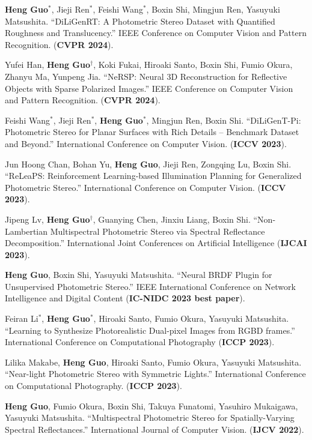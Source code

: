 \documentclass[UTF8]{ctexart}
\begin{document}
\begin{enumerate}[label={[\arabic*]}]
	\item \textbf{Heng Guo}$^*$, Jieji Ren$^*$, Feishi Wang$^*$, Boxin Shi, Mingjun Ren, Yasuyuki Matsushita. ``DiLiGenRT: A Photometric Stereo Dataset with Quantified Roughness and Translucency.'' IEEE Conference on Computer Vision and Pattern Recognition. (\textbf{CVPR 2024}).
	\item Yufei Han, \textbf{Heng Guo$^\dagger$}, Koki Fukai, Hiroaki Santo, Boxin Shi, Fumio Okura, Zhanyu Ma, Yunpeng Jia. ``NeRSP: Neural 3D Reconstruction for Reflective Objects with Sparse Polarized Images.'' IEEE Conference on Computer Vision and Pattern Recognition. (\textbf{CVPR 2024}).
	\item Feishi Wang$^*$, Jieji Ren$^*$, \textbf{Heng Guo}$^*$, Mingjun Ren, Boxin Shi. ``DiLiGenT-Pi: Photometric Stereo for Planar Surfaces with Rich Details – Benchmark Dataset and Beyond.'' International Conference on Computer Vision. (\textbf{ICCV 2023}).
	\item Jun Hoong Chan, Bohan Yu, \textbf{Heng Guo}, Jieji Ren, Zongqing Lu, Boxin Shi. ``ReLeaPS: Reinforcement Learning-based Illumination Planning for Generalized Photometric Stereo.'' International Conference on Computer Vision. (\textbf{ICCV 2023}).
	\item Jipeng Lv, \textbf{Heng Guo$^{\dagger}$}, Guanying Chen, Jinxiu Liang, Boxin Shi. ``Non-Lambertian Multispectral Photometric Stereo via Spectral Reflectance Decomposition.'' International Joint Conferences on Artificial Intelligence (\textbf{IJCAI 2023}).
	\item \textbf{Heng Guo}, Boxin Shi, Yasuyuki Matsushita. ``Neural BRDF Plugin for Unsupervised Photometric Stereo.'' IEEE International Conference on Network Intelligence and Digital Content (\textbf{IC-NIDC 2023 best paper}).
	\item Feiran Li$^*$, \textbf{Heng Guo}$^*$, Hiroaki Santo, Fumio Okura, Yasuyuki Matsushita. ``Learning to Synthesize Photorealistic Dual-pixel Images from RGBD frames.'' International Conference on Computational Photography (\textbf{ICCP 2023}).
	\item Lilika Makabe, \textbf{Heng Guo}, Hiroaki Santo, Fumio Okura, Yasuyuki Matsushita. ``Near-light Photometric Stereo with Symmetric Lights.'' International Conference on Computational Photography. (\textbf{ICCP 2023}).
	\item \textbf{Heng Guo}, Fumio Okura, Boxin Shi, Takuya Funatomi, Yasuhiro Mukaigawa, Yasuyuki Matsushita. ``Multispectral Photometric Stereo for Spatially-Varying Spectral Reflectances.'' International Journal of Computer Vision. (\textbf{IJCV 2022}). 

\end{enumerate}
\end{document}
